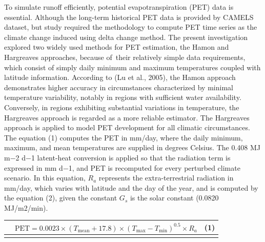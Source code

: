 \documentclass[
]{article}
\newcounter{none} %
\begin{document}
To simulate runoff efficiently, potential evapotranspiration (PET) data
is essential. Although the long-term historical PET data is provided by
CAMELS dataset, but study required the methodology to compute PET time
series as the climate change induced using delta change method. The
present investigation explored two widely used methods for PET
estimation, the Hamon and Hargreaves approaches, because of~their
relatively simple data requirements, which consist of simply daily
minimum and maximum temperatures coupled with latitude information.
According to (Lu et al., 2005), the Hamon approach demonstrates higher
accuracy in circumstances characterized by minimal temperature
variability, notably in regions with sufficient water availability.
Conversely, in regions exhibiting substantial variations in temperature,
the Hargreaves approach is regarded as a more reliable estimator. The
Hargreaves approach is applied to model PET development for all climatic
circumstances. The equation (1) computes the PET in mm/day, where the
daily minimum, maximum, and mean temperatures are supplied in degrees
Celsius. The 0.408 MJ m−2 d−1 latent-heat conversion is applied so that
the radiation term is expressed in mm d−1, and PET is recomputed for
every perturbed climate scenario. In this equation, \(R_{a}\) represents
the extra-terrestrial radiation in mm/day, which varies with latitude
and the day of the year, and is computed by the equation (2), given the
constant \(G_{s}\) is the solar constant (0.0820 MJ/m2/min).

{\def\LTcaptype{none} %
\begin{longtable}[]{@{}
  >{\raggedright\arraybackslash}p{}
  >{\raggedright\arraybackslash}p{}
  >{\raggedright\arraybackslash}p{}@{}}
\toprule\noalign{}
\begin{minipage}[b]{\linewidth}\raggedright
\end{minipage} & \begin{minipage}[b]{\linewidth}\raggedright
\[\text{PET} = 0.0023 \times \left( T_{\text{mean}} + 17.8 \right) \times \left( T_{\text{max}} - T_{\text{min}} \right)^{0.5} \times R_{a}\]
\end{minipage} & \begin{minipage}[b]{\linewidth}\raggedright
(1)
\end{minipage} \\
\midrule\noalign{}
\endhead
\bottomrule\noalign{}
\endlastfoot
\end{longtable}
}
\end{document}
